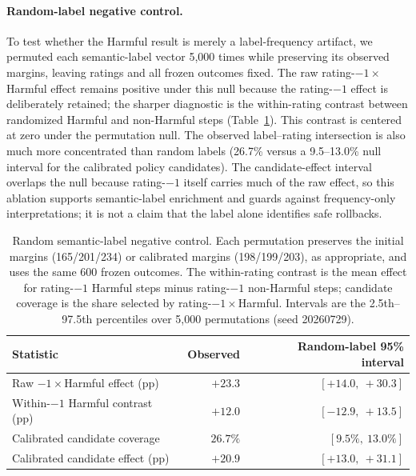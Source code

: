 \documentclass[11pt]{article}
\begin{document}
\paragraph{Random-label negative control.}
To test whether the Harmful result is merely a label-frequency artifact, we permuted each semantic-label vector 5{,}000 times while preserving its observed margins, leaving ratings and all frozen outcomes fixed. The raw rating-$-1\times$Harmful effect remains positive under this null because the rating-$-1$ effect is deliberately retained; the sharper diagnostic is the within-rating contrast between randomized Harmful and non-Harmful steps (Table~\ref{tab:randomlabel}). This contrast is centered at zero under the permutation null. The observed label--rating intersection is also much more concentrated than random labels (26.7\% versus a 9.5--13.0\% null interval for the calibrated policy candidates). The candidate-effect interval overlaps the null because rating-$-1$ itself carries much of the raw effect, so this ablation supports semantic-label enrichment and guards against frequency-only interpretations; it is not a claim that the label alone identifies safe rollbacks.

\begin{table}[t]
\centering
\scriptsize
\setlength{\tabcolsep}{3.0pt}
\begin{tabular}{@{}lrr@{}}
\toprule
Statistic & Observed & Random-label 95\% interval \\
\midrule
Raw $-1\times$Harmful effect (pp) & $+23.3$ & $[+14.0,\ +30.3]$ \\
Within-$-1$ Harmful contrast (pp) & $+12.0$ & $[-12.9,\ +13.5]$ \\
Calibrated candidate coverage & $26.7\%$ & $[9.5\%,\ 13.0\%]$ \\
Calibrated candidate effect (pp) & $+20.9$ & $[+13.0,\ +31.1]$ \\
\bottomrule
\end{tabular}
\caption{Random semantic-label negative control. Each permutation preserves the initial margins (165/201/234) or calibrated margins (198/199/203), as appropriate, and uses the same 600 frozen outcomes. The within-rating contrast is the mean effect for rating-$-1$ Harmful steps minus rating-$-1$ non-Harmful steps; candidate coverage is the share selected by rating-$-1\times$Harmful. Intervals are the 2.5th--97.5th percentiles over 5{,}000 permutations (seed 20260729).}
\label{tab:randomlabel}
\end{table}
\end{document}
